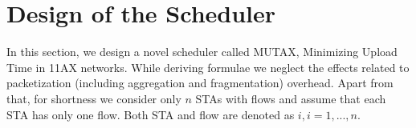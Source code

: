 %
%
%



\section{Design of the Scheduler}
\label{mutex}
In this section, we design a novel scheduler called MUTAX, Minimizing Upload Time in 11AX networks. While deriving formulae we neglect the effects related to packetization (including aggregation and fragmentation) overhead. Apart from that, for shortness we consider only $n$ STAs with flows and assume that each STA has only one flow. Both STA and flow are denoted as $i, i=1,...,n$.


